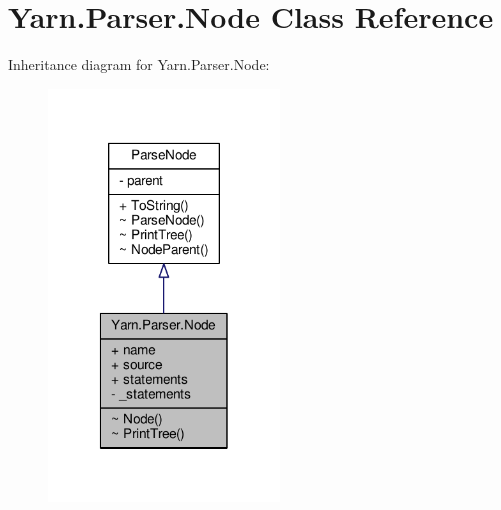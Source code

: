 \hypertarget{a00054}{\section{Yarn.\-Parser.\-Node Class Reference}
\label{a00054}
}


Inheritance diagram for Yarn.\-Parser.\-Node\-:
\nopagebreak
\begin{figure}[H]
\begin{center}
\leavevmode
\includegraphics[width=174pt]{dd/d56/a00274}
\end{center}
\end{figure}


